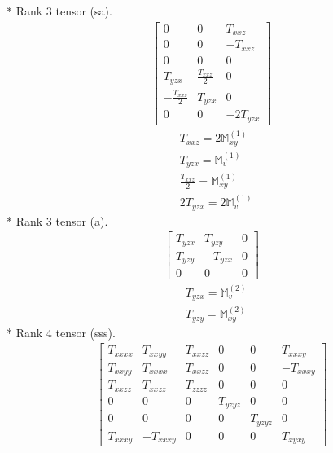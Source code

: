 \documentclass[fleqn,8pt,landscape]{jsarticle}
\begin{document}
* Rank 3 tensor (sa).
\begin{align*}
\begin{bmatrix} 0 & 0 & T_{xxz} \\ 0 & 0 & - T_{xxz} \\ 0 & 0 & 0 \\ T_{yzx} & \frac{T_{xxz}}{2} & 0 \\ - \frac{T_{xxz}}{2} & T_{yzx} & 0 \\ 0 & 0 & - 2 T_{yzx} \end{bmatrix}
\end{align*}
\begin{align*}
& T_{xxz} = 2 \mathbb{M}_{xy}^{(1)} \\
& T_{yzx} = \mathbb{M}_{v}^{(1)} \\
& \frac{T_{xxz}}{2} = \mathbb{M}_{xy}^{(1)} \\
& 2 T_{yzx} = 2 \mathbb{M}_{v}^{(1)}
\end{align*}
* Rank 3 tensor (a).
\begin{align*}
\begin{bmatrix} T_{yzx} & T_{yzy} & 0 \\ T_{yzy} & - T_{yzx} & 0 \\ 0 & 0 & 0 \end{bmatrix}
\end{align*}
\begin{align*}
& T_{yzx} = \mathbb{M}_{v}^{(2)} \\
& T_{yzy} = \mathbb{M}_{xy}^{(2)}
\end{align*}
* Rank 4 tensor (sss).
\begin{align*}
\begin{bmatrix} T_{xxxx} & T_{xxyy} & T_{xxzz} & 0 & 0 & T_{xxxy} \\ T_{xxyy} & T_{xxxx} & T_{xxzz} & 0 & 0 & - T_{xxxy} \\ T_{xxzz} & T_{xxzz} & T_{zzzz} & 0 & 0 & 0 \\ 0 & 0 & 0 & T_{yzyz} & 0 & 0 \\ 0 & 0 & 0 & 0 & T_{yzyz} & 0 \\ T_{xxxy} & - T_{xxxy} & 0 & 0 & 0 & T_{xyxy} \end{bmatrix}
\end{align*}
\end{document}
